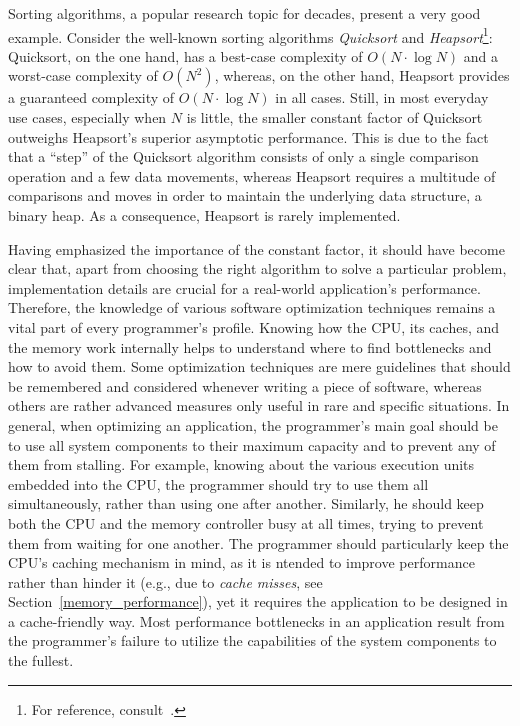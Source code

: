 Sorting algorithms, a popular research topic for decades, present a very good example. Consider the well-known sorting algorithms \emph{Quicksort} and \emph{Heapsort}\footnote{For reference, consult~\cite[pp. 113--122, 144--148]{knuth1998art}.}: Quicksort, on the one hand, has a best-case complexity of $O(N\cdot \log{N})$ and a worst-case complexity of $O(N^{2})$, whereas, on the other hand, Heapsort provides a guaranteed complexity of $O(N\cdot \log{N})$ in all cases. Still, in most everyday use cases, especially when $N$ is little, the smaller constant factor of Quicksort outweighs Heapsort's superior asymptotic performance. This is due to the fact that a ``step'' of the Quicksort algorithm consists of only a single comparison operation and a few data movements, whereas Heapsort requires a multitude of comparisons and moves in order to maintain the underlying data structure, a binary heap. As a consequence, Heapsort is rarely implemented.

Having emphasized the importance of the constant factor, it should have become clear that, apart from choosing the right algorithm to solve a particular problem, implementation details are crucial for a real-world application's performance. Therefore, the knowledge of various software optimization techniques remains a vital part of every programmer's profile. Knowing how the CPU, its caches, and the memory work internally helps to understand where to find bottlenecks and how to avoid them. Some optimization techniques are mere guidelines that should be remembered and considered whenever writing a piece of software, whereas others are rather advanced measures only useful in rare and specific situations. In general, when optimizing an application, the programmer's main goal should be to use all system components to their maximum capacity and to prevent any of them from stalling. For example, knowing about the various execution units embedded into the CPU, the programmer should try to use them all simultaneously, rather than using one after another. Similarly, he should keep both the CPU and the memory controller busy at all times, trying to prevent them from waiting for one another. The programmer should particularly keep the CPU's caching mechanism in mind, as it is ntended to improve performance rather than hinder it (e.g., due to \emph{cache misses}, see Section~\ref{memory_performance}), yet it requires the application to be designed in a cache-friendly way. Most performance bottlenecks in an application result from the programmer's failure to utilize the capabilities of the system components to the fullest.

